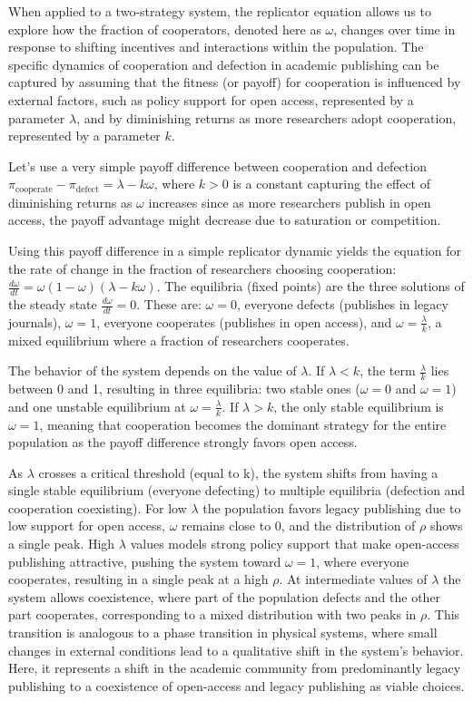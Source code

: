 \documentclass[amsfonts, amssymb, prl, superscriptaddress, notitlepage, twocolumn, nofootinbib]{revtex4-2}
\begin{document}
When applied to a two-strategy system, the replicator equation allows us to explore how the fraction of cooperators, denoted here as $\omega$, changes over time in response to shifting incentives and interactions within the population. The specific dynamics of cooperation and defection in academic publishing can be captured by assuming that the fitness (or payoff) for cooperation is influenced by external factors, such as policy support for open access, represented by a parameter $\lambda$, and by diminishing returns as more researchers adopt cooperation, represented by a parameter $k$. 

Let's use a very simple payoff difference between cooperation and defection $\pi_{\text{cooperate}} - \pi_{\text{defect}} = \lambda - k \omega$,
where $k > 0$ is a constant capturing the effect of diminishing returns as $\omega$ increases since as more researchers publish in open access, the payoff advantage might decrease due to saturation or competition.

Using this payoff difference in a simple replicator dynamic yields the equation for the rate of change in the fraction of researchers choosing cooperation: $\frac{d\omega}{dt} = \omega (1 - \omega)(\lambda - k \omega)$. The equilibria (fixed points) are the three solutions of the steady state $\frac{d\omega}{dt} = 0$. These are: $\omega = 0$, everyone defects (publishes in legacy journals), $\omega = 1$, everyone cooperates (publishes in open access), and $\omega = \frac{\lambda}{k}$, a mixed equilibrium where a fraction of researchers cooperates.

The behavior of the system depends on the value of $\lambda$. If $\lambda < k$, the term $\frac{\lambda}{k}$ lies between 0 and 1, resulting in three equilibria: two stable ones ($\omega = 0$ and $\omega = 1$) and one unstable equilibrium at $\omega = \frac{\lambda}{k}$. If $\lambda > k$, the only stable equilibrium is $\omega = 1$, meaning that cooperation becomes the dominant strategy for the entire population as the payoff difference strongly favors open access.

As $\lambda$ crosses a critical threshold (equal to k), the system shifts from having a single stable equilibrium (everyone defecting) to multiple equilibria (defection and cooperation coexisting). For low $\lambda$ the population favors legacy publishing due to low support for open access, $\omega$ remains close to 0, and the distribution of $\rho$ shows a single peak. High $\lambda$ values models strong policy support that make open-access publishing attractive, pushing the system toward $\omega = 1$, where everyone cooperates, resulting in a single peak at a high $\rho$. At intermediate values of $\lambda$ the system allows coexistence, where part of the population defects and the other part cooperates, corresponding to a mixed distribution with two peaks in $\rho$. This transition is analogous to a phase transition in physical systems, where small changes in external conditions lead to a qualitative shift in the system's behavior. Here, it represents a shift in the academic community from predominantly legacy publishing to a coexistence of open-access and legacy publishing as viable choices.
\end{document}
